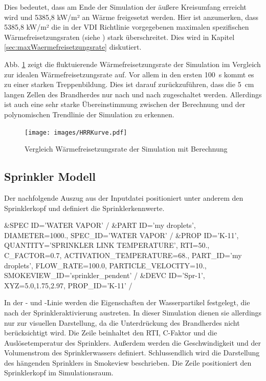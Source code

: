 Dies bedeutet, dass am Ende der Simulation der äußere Kreisumfang erreicht wird und 5385,8 kW/m² an Wärme freigesetzt werden. Hier ist anzumerken, dass 5385,8 kW/m² die in der VDI Richtlinie vorgegebenen maximalen spezifischen Wärmefreisetzungsraten (siehe \cite[S.12]{VDI6019B1}) stark überschreitet. 
Dies wird in Kapitel \ref{sec:maxWaermefreisetzungsrate} diskutiert. 

Abb. \ref{fig:HRR} zeigt die fluktuierende Wärmefreisetzungsrate der Simulation im Vergleich zur idealen Wärmefreisetzungsrate auf. Vor allem in den ersten 100~s kommt es zu einer starken Treppenbildung. Dies ist darauf zurückzuführen, dass die 5~cm langen Zellen des Brandherdes nur nach und nach zugeschaltet werden. Allerdings ist auch eine sehr starke Übereinstimmung zwischen der Berechnung und der polynomischen Trendlinie der Simulation zu erkennen.



\begin{figure}[b]
    \centering
    \texttt{[image: images/HRRKurve.pdf]}
    \caption{Vergleich Wärmefreisetzungsrate der Simulation mit Berechnung}
    \label{fig:HRR}
\end{figure}

\subsection{Sprinkler Modell}
\label{sec:SprinklerModell}

Der nachfolgende Auszug aus der Inputdatei positioniert unter anderem den Sprinklerkopf und definiert die Sprinklerkennwerte.
\begin{GenericCode}[numbers=none]
&SPEC ID='WATER VAPOR' /
&PART ID='my droplets', DIAMETER=1000., SPEC_ID='WATER VAPOR' /
&PROP ID='K-11', QUANTITY='SPRINKLER LINK TEMPERATURE', RTI=50., C_FACTOR=0.7, ACTIVATION_TEMPERATURE=68., PART_ID='my droplets', FLOW_RATE=100.0, PARTICLE_VELOCITY=10., SMOKEVIEW_ID='sprinkler_pendent' /
&DEVC ID='Spr-1', XYZ=5.0,1.75,2.97, PROP_ID='K-11' /
\end{GenericCode}
In der - und -Linie werden die Eigenschaften der Wasserpartikel festgelegt, die nach der Sprinkleraktivierung austreten. In dieser Simulation dienen sie allerdings nur zur visuellen Darstellung, da die Unterdrückung des Brandherdes nicht berücksichtigt wird. 
Die  Zeile beinhaltet den RTI, C-Faktor und die Auslösetemperatur des Sprinklers.  Außerdem werden die Geschwindigkeit und der Volumenstrom des Sprinklerwassers definiert. Schlussendlich wird die Darstellung des hängenden Sprinklers in Smokeview beschrieben.
Die Zeile  positioniert den Sprinklerkopf im Simulationsraum.


